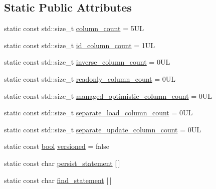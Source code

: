 \subsection*{Static Public Attributes}
\begin{DoxyCompactItemize}
\item 
static const std\+::size\+\_\+t \hyperlink{classodb_1_1access_1_1object__traits__impl_3_01_1_1_graph_00_01id__pgsql_01_4_a3999f5cbb43599f390d45959eed1bdb0}{column\+\_\+count} = 5\+U\+L
\item 
static const std\+::size\+\_\+t \hyperlink{classodb_1_1access_1_1object__traits__impl_3_01_1_1_graph_00_01id__pgsql_01_4_a4e0b4fc513239a929302cb8b7d73ed50}{id\+\_\+column\+\_\+count} = 1\+U\+L
\item 
static const std\+::size\+\_\+t \hyperlink{classodb_1_1access_1_1object__traits__impl_3_01_1_1_graph_00_01id__pgsql_01_4_a7ab1fc6d67482d370b97627fcf246d99}{inverse\+\_\+column\+\_\+count} = 0\+U\+L
\item 
static const std\+::size\+\_\+t \hyperlink{classodb_1_1access_1_1object__traits__impl_3_01_1_1_graph_00_01id__pgsql_01_4_a9a28ce883bafa9345f1d0f1e05258e80}{readonly\+\_\+column\+\_\+count} = 0\+U\+L
\item 
static const std\+::size\+\_\+t \hyperlink{classodb_1_1access_1_1object__traits__impl_3_01_1_1_graph_00_01id__pgsql_01_4_a3c5cd9e7f7de6df0cdd5a6413e3f5f50}{managed\+\_\+optimistic\+\_\+column\+\_\+count} = 0\+U\+L
\item 
static const std\+::size\+\_\+t \hyperlink{classodb_1_1access_1_1object__traits__impl_3_01_1_1_graph_00_01id__pgsql_01_4_af5a940ea91824098e6e5dfb40a6e42f1}{separate\+\_\+load\+\_\+column\+\_\+count} = 0\+U\+L
\item 
static const std\+::size\+\_\+t \hyperlink{classodb_1_1access_1_1object__traits__impl_3_01_1_1_graph_00_01id__pgsql_01_4_a947c35711679840a6fdbe6c2223dbbad}{separate\+\_\+update\+\_\+column\+\_\+count} = 0\+U\+L
\item 
static const \hyperlink{classodb_1_1access_1_1object__traits_3_01_1_1_graph_01_4_a2f6665ffbf77fb06f9a323ac98c30983}{bool} \hyperlink{classodb_1_1access_1_1object__traits__impl_3_01_1_1_graph_00_01id__pgsql_01_4_afd90031a3c1d36106cdda18876c18999}{versioned} = false
\item 
static const char \hyperlink{classodb_1_1access_1_1object__traits__impl_3_01_1_1_graph_00_01id__pgsql_01_4_a37775bd409ba8bd56c3fc31637d207f6}{persist\+\_\+statement} \mbox{[}$\,$\mbox{]}
\item 
static const char \hyperlink{classodb_1_1access_1_1object__traits__impl_3_01_1_1_graph_00_01id__pgsql_01_4_aaf8256f9a775ee3c71c77ed6f0dd47be}{find\+\_\+statement} \mbox{[}$\,$\mbox{]}

\end{DoxyCompactItemize}
